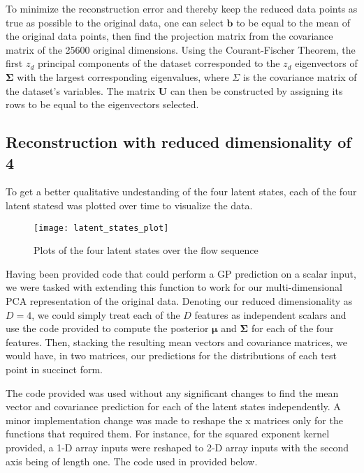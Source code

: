To minimize the reconstruction error and thereby keep the reduced data points as true as possible to the original data, one can select $\mathbf{b}$ to be equal to the mean of the original data points, then find the projection matrix from the covariance matrix of the 25600 original dimensions. Using the Courant-Fischer Theorem, the first $z_d$ principal components of the dataset corresponded to the $z_d$ eigenvectors of $\mathbf{\Sigma}$ with the largest corresponding eigenvalues, where $\Sigma$ is the covariance matrix of the dataset's variables. The matrix $\mathbf{U}$ can then be constructed by assigning its rows to be equal to the eigenvectors selected.

\subsection{Reconstruction with reduced dimensionality of 4}
To get a better qualitative undestanding of the four latent states, each of the four latent statesd was plotted over time to visualize the data.

\begin{figure}
\begin{center}
\texttt{[image: latent\_states\_plot]}
\caption{Plots of the four latent states over the flow sequence}
\end{center}
\end{figure}
\newpage
{}
Having been provided code that could perform a GP prediction on a scalar input, we were tasked with extending this function to work for our multi-dimensional PCA representation of the original data. Denoting our reduced dimensionality as $D = 4$, we could simply treat each of the $D$ features as independent scalars and use the code provided to compute the posterior $\boldsymbol{\mu}$ and $\mathbf{\Sigma}$ for each of the four features. Then, stacking the resulting mean vectors and covariance matrices, we would have, in two matrices, our predictions for the distributions of each test point in succinct form.

The code provided was used without any significant changes to find the mean vector and covariance prediction for each of the latent states independently. A minor implementation change was made to reshape the x matrices only for the functions that required them. For instance, for the squared exponent kernel provided, a 1-D array inputs were reshaped to 2-D array inputs with the second axis being of length one. The code used in provided below.

